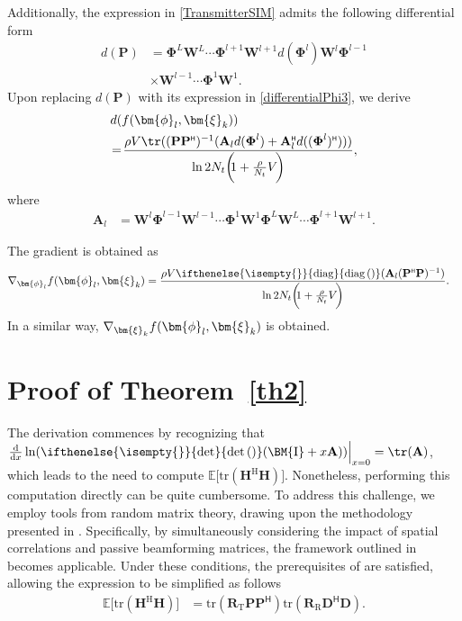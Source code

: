 \documentclass[twocolumn,10pt]{IEEEtran}
\newcommand{\vect}[1]{{\lowercase{\mbs{#1}}}}
\newcommand{\mbs}[1]{\bm{#1}}
\newcommand{\mat}[1]{{\uppercase{\mbs{#1}}}}
\newcommand{\Id}{\mat{\mathrm{I}}}
\renewcommand{\H}{{\scriptscriptstyle\mathsf{H}}}
\newcommand{\bphi}{\vect{\phi}}
\def\bA{{\mathbf{A}}}
\def\bD{{\mathbf{D}}}
\def\bP{{\mathbf{P}}}
\def\bR{{\mathbf{R}}}
\def\bW{{\mathbf{W}}}
\def\bxi{{\bm{\xi}}}
\def\bxi{{\bm{\xi}}}
\renewcommand{\det}[1][]{\ifthenelse{\isempty{#1}}{\text{det}}{\text{det}\left(#1\right)}}
\newcommand{\diag}[1][]{\ifthenelse{\isempty{#1}}{\text{diag}}{\text{diag}\left(#1\right)}}
\def\nn{\nonumber}
\def\bPhi{{\boldsymbol{\Phi}}}
\begin{document}
\begin{appendices}
		
		Additionally, the expression in \eqref{TransmitterSIM} admits the following differential form\begin{align}
			d(\bP)&=\bPhi^{L}\bW^{L}\cdots\bPhi^{l+1}\bW^{l+1}d(\bPhi^{l})\bW^{l}\bPhi^{l-1}\nn\\
			&\times\bW^{l-1}\cdots\bPhi^{1}\bW^{1}. \label{differentialPhi4}
		\end{align}
		Upon replacing $d(\bP)$ with its expression in \eqref{differentialPhi3}, we derive
		\begin{align}
			&	d(f(\bphi_{l},\bxi_{k}))\nn\\
			&		\!=\! \frac{\rho V \tr((\bP\bP^{\H})^{-1} (\bA_{l} d(\bPhi^{l}) +\bA_{l}^{\H} d((\bPhi^{l})^{\H})  )) }{ \ln2  N_{t} \bigg(\!\!1+\frac{\rho}{N_{t}} V\!\bigg)},\label{differentialPhi5}
		\end{align}
		where 
		\begin{align}
			\bA_{l}&\!=\!\bW^{l}\bPhi^{l-1}\bW^{l-1}\!\cdots\! \bPhi^{1}\bW^{1}\bPhi^{L}\bW^{L}\cdots\bPhi^{l+1}\bW^{l+1}.
		\end{align}
		
		
		The gradient is obtained as
		\begin{align}
			\nabla_{\bphi_{l}}f(\bphi_{l},\bxi_{k})&=	\frac{\rho V\diag(\bA_{l}(\bP^{\H}\bP)^{-1} ) }{ \ln2 N_{t} \bigg(\!\!1+\frac{\rho}{N_{t}} V\!\bigg)}.
		\end{align}
		In a similar way, $\nabla_{\bxi_{k}}f(\bphi_{l},\bxi_{k})$ is obtained.
		
		\section{Proof of Theorem~\ref{th2}}\label{th2proof}
		The derivation commences by recognizing that $\frac{\mathrm{d}}{\mathrm{d} x}	\ln(\det(\Id+x \bA))\Bigr|_{\substack{x=0}}=\tr (\bA)$, 
		which leads to the need to compute $\mathbb{E}\big[\mathrm{tr}\left(\mathbf{H}^{\mathrm{H}}\mathbf{H}\right)\big]$. Nonetheless, performing this computation directly can be quite cumbersome. To address this challenge, we employ tools from random matrix theory, drawing upon the methodology presented in \cite{Lozano2003}. Specifically, by simultaneously considering the impact of spatial correlations and passive beamforming matrices, the framework outlined in \cite[Appendix B]{Lozano2003}  becomes applicable. Under these conditions, the prerequisites of \cite[Lemma 3]{Lozano2003} are satisfied, allowing the expression to be simplified as follows
		\begin{align}
			\mathbb{E}\big[\mathrm{tr}\left(\mathbf{H}^{\mathrm{H}}\mathbf{H}\right)\big]
			&=\mathrm{tr}\left(\bR_{\mathrm{T}}\bP\bP^{\H}\right)\mathrm{tr}\left(\bR_{\mathrm{R}}\bD^{\H}\bD\right)\label{MI3}.
		\end{align}
		

\end{appendices}
\end{document}
